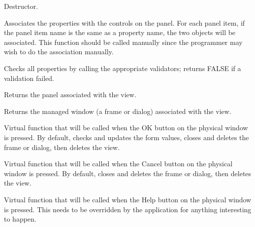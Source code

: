 Destructor.

\label{wxpropertyformviewassociatenames}


Associates the properties with the controls on the panel. For each panel item, if the
panel item name is the same as a property name, the two objects will be associated.
This function should be called manually since the programmer may wish to do the
association manually.

\label{wxpropertyformviewcheck}


Checks all properties by calling the appropriate validators; returns FALSE if a validation failed.

\label{wxpropertyformviewgetpanel}


Returns the panel associated with the view.

\label{wxpropertyformviewgetmanagedwindow}


Returns the managed window (a frame or dialog) associated with the view.

\label{wxpropertyformviewonok}


Virtual function that will be called when the OK button on the physical window is pressed.
By default, checks and updates the form values, closes and deletes the frame or dialog, then deletes the view.

\label{wxpropertyformviewoncancel}


Virtual function that will be called when the Cancel button on the physical window is pressed.
By default, closes and deletes the frame or dialog, then deletes the view.

\label{wxpropertyformviewonhelp}


Virtual function that will be called when the Help button on the physical window is pressed.
This needs to be overridden by the application for anything interesting to happen.


